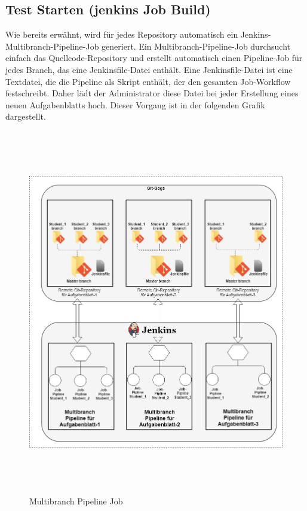 \documentclass[a4paper,12pt,oneside]{book}
\begin{document}
\subsection{Test Starten (jenkins Job Build)}
Wie bereits erwähnt, wird für jedes Repository automatisch ein Jenkins-Multibranch-Pipeline-Job generiert. Ein Multibranch-Pipeline-Job durchsucht einfach das Quellcode-Repository und erstellt automatisch einen Pipeline-Job für jedes Branch, das eine Jenkinsfile-Datei enthält. 
\newline
Eine Jenkinsfile-Datei ist eine Textdatei, die die Pipeline als Skript enthält, der den gesamten Job-Workflow festschreibt. Daher lädt der Administrator diese Datei bei jeder Erstellung eines neuen Aufgabenblatts hoch. Dieser Vorgang ist in der folgenden Grafik dargestellt.
\newpage
\begin{figure}[h!]
	\begin{center}
		\includegraphics[width=13cm, height=16cm]{GogsJenkins.jpg}
		\caption{Multibranch Pipeline Job} 
		\label{ Multibranch Pipeline Job } 
	\end{center}
\end{figure}
\end{document}
